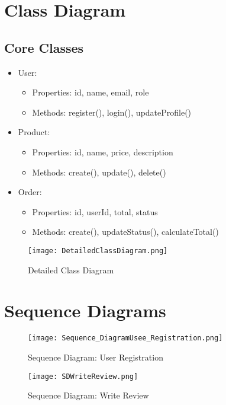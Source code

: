 \section{Class Diagram}
\subsection{Core Classes}
\begin{itemize}
    \item User:
    \begin{itemize}
        \item Properties: id, name, email, role
        \item Methods: register(), login(), updateProfile()
    \end{itemize}
    \item Product:
    \begin{itemize}
        \item Properties: id, name, price, description
        \item Methods: create(), update(), delete()
    \end{itemize}
    \item Order:
    \begin{itemize}
        \item Properties: id, userId, total, status
        \item Methods: create(), updateStatus(), calculateTotal()
    \end{itemize}
\end{itemize}

\begin{figure}[h]
    \centering
    \texttt{[image: DetailedClassDiagram.png]}
    \caption{Detailed Class Diagram}
    \label{fig:class-diagram}
\end{figure}

\section{Sequence Diagrams}
\begin{figure}[h]
    \centering
    \texttt{[image: Sequence\_DiagramUsee\_Registration.png]}
    \caption{Sequence Diagram: User Registration}
    \label{fig:sd-registration}
\end{figure}

\begin{figure}[h]
    \centering
    \texttt{[image: SDWriteReview.png]}
    \caption{Sequence Diagram: Write Review}
    \label{fig:sd-write-review}
\end{figure}

